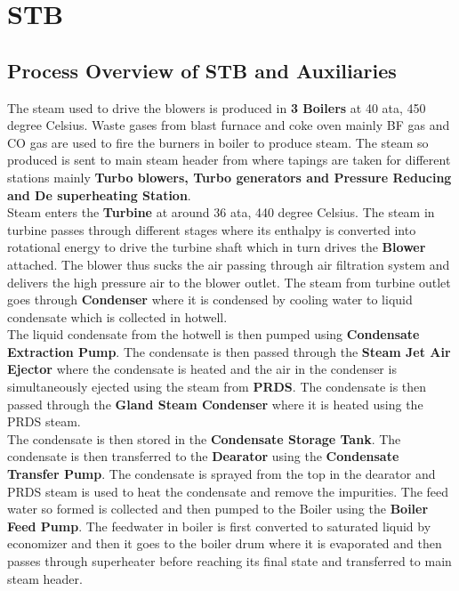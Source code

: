 \documentclass[english,11pt]{report}
\begin{document}
\chapter{STB}
\section{Process Overview of STB and Auxiliaries}
The steam used to drive the blowers is produced in \textbf{3 Boilers} at 40 ata, 450 degree Celsius. Waste gases from blast furnace and coke oven mainly BF gas and CO gas are used to fire the
burners in boiler to produce steam. The steam so produced is sent to main steam header from
where tapings are taken for different stations mainly \textbf{Turbo blowers, Turbo generators and
Pressure Reducing and De superheating Station}.\\[1em]
Steam enters the \textbf{Turbine} at around 36 ata, 440 degree Celsius. The steam in turbine passes
through different stages where its enthalpy is converted into rotational energy to drive the
turbine shaft which in turn drives the \textbf{Blower} attached. The blower thus sucks the air passing through air filtration system and delivers the high pressure air to the blower outlet. The steam from turbine outlet goes through \textbf{Condenser} where it is condensed by cooling water to liquid condensate which is collected in hotwell.\\[1em]
The liquid condensate from the hotwell is then pumped using \textbf{Condensate Extraction Pump}.
The condensate is then passed through the \textbf{Steam Jet Air Ejector} where the condensate is
heated and the air in the condenser is simultaneously ejected using the steam from \textbf{PRDS}. The condensate is then passed through the \textbf{Gland Steam Condenser} where it is heated using the PRDS steam.\\[1em]
The condensate is then stored in the \textbf{Condensate Storage Tank}. The condensate is then
transferred to the \textbf{Dearator} using the \textbf{Condensate Transfer Pump}. The condensate is sprayed from the top in the dearator and PRDS steam is used to heat the condensate and remove the
impurities. The feed water so formed is collected and then pumped to the Boiler using the
\textbf{Boiler Feed Pump}. The feedwater in boiler is first converted to saturated liquid by
economizer and then it goes to the boiler drum where it is evaporated and then passes through
superheater before reaching its final state and transferred to main steam header.
\end{document}
